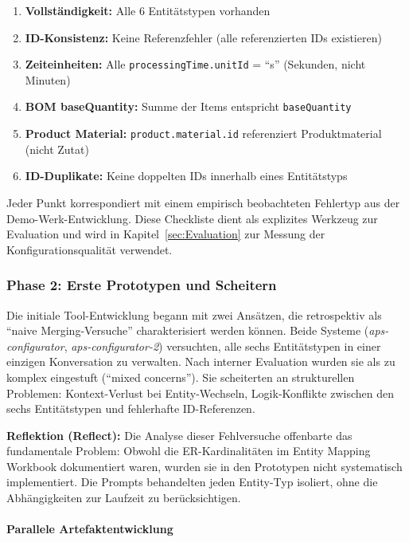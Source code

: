 \begin{enumerate}
    \item \textbf{Vollständigkeit:} Alle 6 Entitätstypen vorhanden
    \item \textbf{ID-Konsistenz:} Keine Referenzfehler (alle referenzierten IDs existieren)
    \item \textbf{Zeiteinheiten:} Alle \texttt{processingTime.unitId} = ``s'' (Sekunden, nicht Minuten)
    \item \textbf{BOM baseQuantity:} Summe der Items entspricht \texttt{baseQuantity}
    \item \textbf{Product Material:} \texttt{product.material.id} referenziert Produktmaterial (nicht Zutat)
    \item \textbf{ID-Duplikate:} Keine doppelten IDs innerhalb eines Entitätstyps
\end{enumerate}

Jeder Punkt korrespondiert mit einem empirisch beobachteten Fehlertyp aus der Demo-Werk-Entwicklung. Diese Checkliste dient als explizites Werkzeug zur Evaluation und wird in Kapitel~\ref{sec:Evaluation} zur Messung der Konfigurationsqualität verwendet.


\subsubsection{Phase 2: Erste Prototypen und Scheitern}
\label{subsubsec:Phase2}

Die initiale Tool-Entwicklung begann mit zwei Ansätzen, die retrospektiv als ``naive Merging-Versuche'' charakterisiert werden können. Beide Systeme (\textit{aps-configurator}, \textit{aps-configurator-2}) versuchten, alle sechs Entitätstypen in einer einzigen Konversation zu verwalten. Nach interner Evaluation wurden sie als zu komplex eingestuft (``mixed concerns''). Sie scheiterten an strukturellen Problemen: Kontext-Verlust bei Entity-Wechseln, Logik-Konflikte zwischen den sechs Entitätstypen und fehlerhafte ID-Referenzen.

\textbf{Reflektion (Reflect):} Die Analyse dieser Fehlversuche offenbarte das fundamentale Problem: Obwohl die ER-Kardinalitäten im Entity Mapping Workbook dokumentiert waren, wurden sie in den Prototypen nicht systematisch implementiert. Die Prompts behandelten jeden Entity-Typ isoliert, ohne die Abhängigkeiten zur Laufzeit zu berücksichtigen.

\paragraph{Parallele Artefaktentwicklung}

